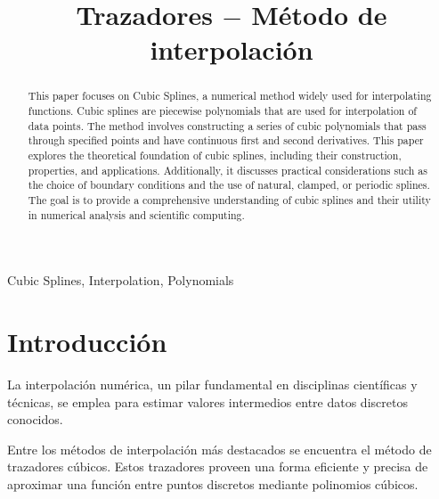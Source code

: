 \documentclass[conference]{IEEEtran}
\begin{document}
\title{Trazadores $-$ Método de interpolación\\}

\author{
	}

\maketitle




\begin{abstract} This paper focuses on Cubic Splines, a numerical method
	widely used for interpolating functions. Cubic splines are piecewise
	polynomials that are used for interpolation of data points. The method
	involves constructing a series of cubic polynomials that pass through
	specified points and have continuous first and second derivatives. This
	paper explores the theoretical foundation of cubic splines, including
	their construction, properties, and applications. Additionally, it
	discusses practical considerations such as the choice of boundary
	conditions and the use of natural, clamped, or periodic splines. The goal
	is to provide a comprehensive understanding of cubic splines and their
	utility in numerical analysis and scientific computing.
\end{abstract}

\begin{IEEEkeywords}
	Cubic Splines, Interpolation, Polynomials
\end{IEEEkeywords}

\nocite{Trazadores_cúbicos_2014}
\nocite{Chapra_Canale}

\section{Introducción}

La interpolación numérica, un pilar fundamental en disciplinas científicas y
técnicas, se emplea para estimar valores intermedios entre datos discretos
conocidos.

Entre los métodos de interpolación más destacados se encuentra
el método de trazadores cúbicos. Estos trazadores proveen una forma eficiente
y precisa de aproximar una función entre puntos discretos mediante polinomios
cúbicos.
\end{document}
